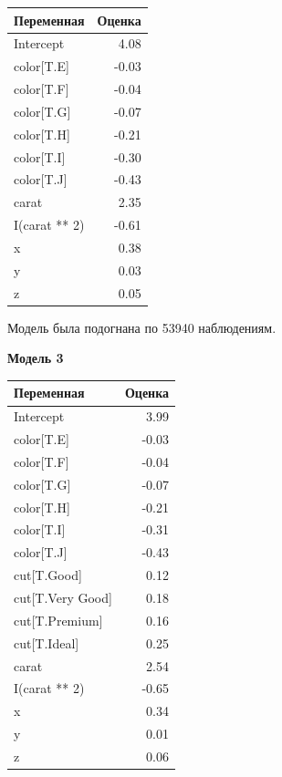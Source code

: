 \documentclass[
  russian,
]{article}
\newcounter{none} %
\begin{document}
{\def\LTcaptype{none} %
\begin{longtable}[]{@{}lr@{}}
\toprule\noalign{}
Переменная & Оценка \\
\midrule\noalign{}
\endhead
\bottomrule\noalign{}
\endlastfoot
Intercept & 4.08 \\
color{[}T.E{]} & -0.03 \\
color{[}T.F{]} & -0.04 \\
color{[}T.G{]} & -0.07 \\
color{[}T.H{]} & -0.21 \\
color{[}T.I{]} & -0.30 \\
color{[}T.J{]} & -0.43 \\
carat & 2.35 \\
I(carat ** 2) & -0.61 \\
x & 0.38 \\
y & 0.03 \\
z & 0.05 \\
\end{longtable}
}

Модель была подогнана по 53940 наблюдениям.

\textbf{Модель 3}

{\def\LTcaptype{none} %
\begin{longtable}[]{@{}lr@{}}
\toprule\noalign{}
Переменная & Оценка \\
\midrule\noalign{}
\endhead
\bottomrule\noalign{}
\endlastfoot
Intercept & 3.99 \\
color{[}T.E{]} & -0.03 \\
color{[}T.F{]} & -0.04 \\
color{[}T.G{]} & -0.07 \\
color{[}T.H{]} & -0.21 \\
color{[}T.I{]} & -0.31 \\
color{[}T.J{]} & -0.43 \\
cut{[}T.Good{]} & 0.12 \\
cut{[}T.Very Good{]} & 0.18 \\
cut{[}T.Premium{]} & 0.16 \\
cut{[}T.Ideal{]} & 0.25 \\
carat & 2.54 \\
I(carat ** 2) & -0.65 \\
x & 0.34 \\
y & 0.01 \\
z & 0.06 \\
\end{longtable}
}
\end{document}
